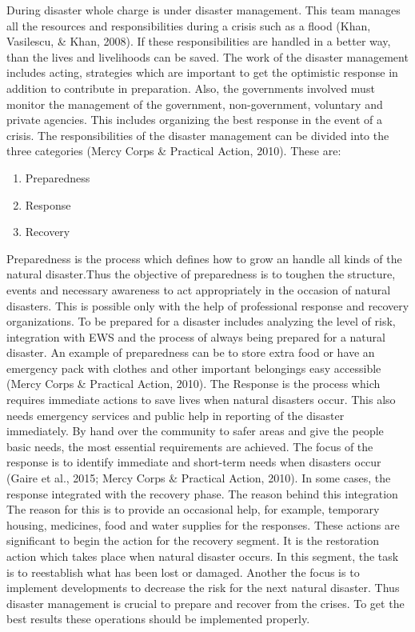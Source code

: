 During disaster whole charge is under disaster management.  This team manages all the resources and responsibilities during  a crisis such as a flood (Khan, Vasilescu, & Khan, 2008). If these responsibilities are handled in a better way, than the lives and livelihoods can be saved. The work of the disaster management includes  acting, strategies which are important  to get the optimistic response in addition to contribute in preparation. Also, the governments involved must monitor the management of the government, non-government, voluntary and private agencies. This includes organizing the best response in the event of a crisis. 
The responsibilities of the disaster management can be divided into the three categories  (Mercy Corps & Practical Action, 2010). These are:
\begin{enumerate}
\item Preparedness
\item Response
\item Recovery
\end{enumerate}

Preparedness is the process which defines how to grow  an handle all kinds of the natural disaster.Thus the objective of preparedness is to toughen the structure, events and necessary awareness to act appropriately in  the occasion of natural disasters. This is possible only with the help of professional response and recovery organizations. To be prepared for a disaster includes analyzing the level of risk, integration with EWS and the process of always being prepared for a natural disaster. An example of preparedness can be to store extra food or have an emergency pack with clothes and other important   belongings easy accessible (Mercy Corps & Practical Action, 2010). 
The Response  is the process which requires  immediate actions to save lives when natural disasters occur. This also needs emergency services and public help in  reporting of the disaster immediately. By hand over the community to safer areas and give the people basic needs, the most essential requirements are achieved. The focus of the response is to identify immediate and short-term needs when disasters occur (Gaire et al., 2015; Mercy Corps & Practical Action, 2010).
In some cases, the response integrated with the recovery phase. The reason behind this integration The reason for this is to provide an occasional help, for example, temporary housing, medicines, food and water supplies for the responses. These actions are significant to begin the action for the recovery segment. It is the restoration action which takes place when natural disaster occurs. In this segment, the task is to reestablish what has been lost or damaged. Another the focus is to implement developments to decrease the risk for the next natural disaster.
Thus disaster management is crucial to prepare and recover from the crises. To get the best results these operations should be implemented properly.

